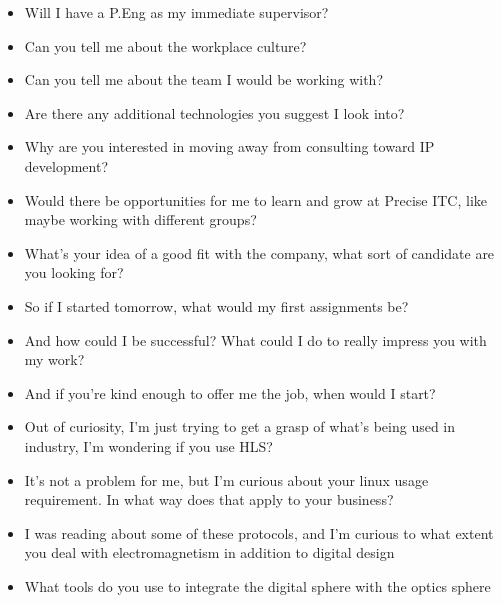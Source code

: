 \documentclass{IEEEtran}
\begin{document}
\begin{itemize}
\item Will I have a P.Eng as my immediate supervisor?
\item Can you tell me about the workplace culture?
\item Can you tell me about the team I would be working with?
\item Are there any additional technologies you suggest I look into?


\item Why are you interested in moving away from consulting toward IP development?
\item Would there be opportunities for me to learn and grow at Precise ITC, like maybe working with different groups?
\item What's your idea of a good fit with the company, what sort of candidate are you looking for?


\item So if I started tomorrow, what would my first assignments be?
\item And how could I be successful? What could I do to really impress you with my work?
\item And if you're kind enough to offer me the job, when would I start?


\item Out of curiosity, I'm just trying to get a grasp of what's being used in industry, I'm wondering if you use HLS?
\item It's not a problem for me, but I'm curious about your linux usage requirement. In what way does that apply to your business?

\item I was reading about some of these protocols, and I'm curious to what extent you deal with electromagnetism in addition to digital design

\item What tools do you use to integrate the digital sphere with the optics sphere

\end{itemize}




\end{document}
